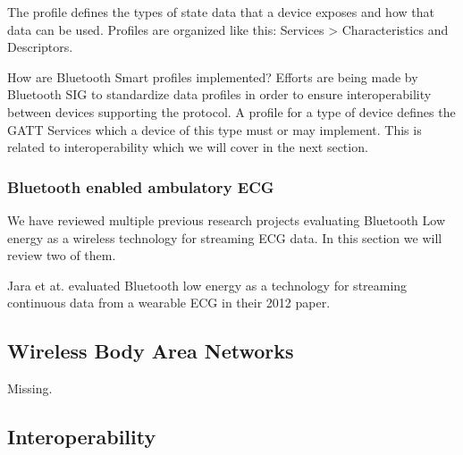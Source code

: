 The profile defines the types of state data that a device exposes and how that data can be used. Profiles are organized like this: Services > Characteristics and Descriptors.

How are Bluetooth Smart profiles implemented? Efforts are being made by Bluetooth SIG to standardize data profiles in order to ensure interoperability between devices supporting the protocol. A profile for a type of device defines the GATT Services which a device of this type must or may implement. This is related to interoperability which we will cover in the next section.


\subsubsection{Bluetooth enabled ambulatory ECG} %
\label{ssub:bluetooth_enabled_ambulatory_ecg}

We have reviewed multiple previous research projects evaluating Bluetooth Low energy as a wireless technology for streaming ECG data. In this section we will review two of them.

Jara et at. evaluated Bluetooth low energy as a technology for streaming continuous data from a wearable ECG in their 2012 paper. 




\subsection{Wireless Body Area Networks} %
\label{sub:wireless_body_area_networks}

Missing.



\subsection{Interoperability} %
\label{sub:interoperability}

